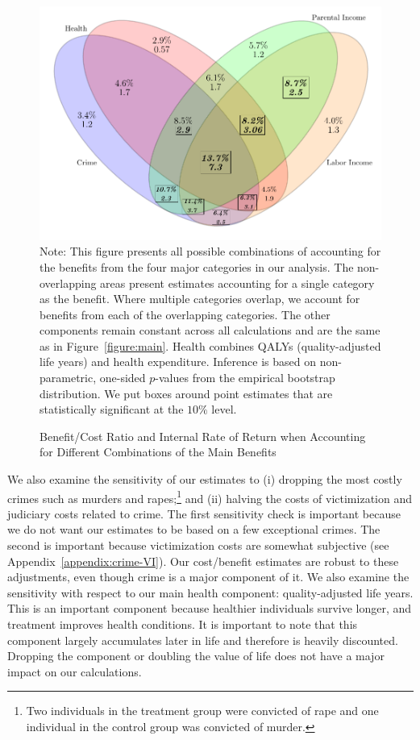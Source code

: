 \begin{figure}[!htbp]
\caption{Benefit/Cost Ratio and Internal Rate of Return when Accounting for Different Combinations of the Main Benefits}\label{figure:vennpooled}
\centering
\includegraphics[width=.7\columnwidth]{output/venn_pooled.pdf}
\footnotesize \justify
Note: This figure presents all possible combinations of accounting for the benefits from the four major categories in our analysis. The non-overlapping areas present estimates accounting for a single category as the benefit. Where multiple categories overlap, we account for benefits from each of the overlapping categories. The other components remain constant across all calculations and are the same as in Figure~\ref{figure:main}. Health combines QALYs (quality-adjusted life years) and health expenditure. Inference is based on non-parametric, one-sided $p$-values from the empirical bootstrap distribution. We put boxes around point estimates that are statistically significant at the $10\%$ level.
\end{figure}

We also examine the sensitivity of our estimates to (i) dropping the most costly crimes such as murders and rapes;\footnote{Two individuals in the treatment group were convicted of rape and one individual in the control group was convicted of murder.} and (ii) halving the costs of victimization and judiciary costs related to crime. The first sensitivity check is important because we do not want our estimates to be based on a few exceptional crimes. The second is important because victimization costs are somewhat subjective (see  Appendix~\ref{appendix:crime-VI}). Our cost/benefit estimates are robust to these adjustments, even though crime is a major component of it. We also examine the sensitivity with respect to our main health component: quality-adjusted life years. This is an important component because healthier individuals survive longer, and treatment improves health conditions. It is important to note that this component largely accumulates later in life and therefore is heavily discounted. Dropping the component or doubling the value of life does not have a major impact on our calculations.

